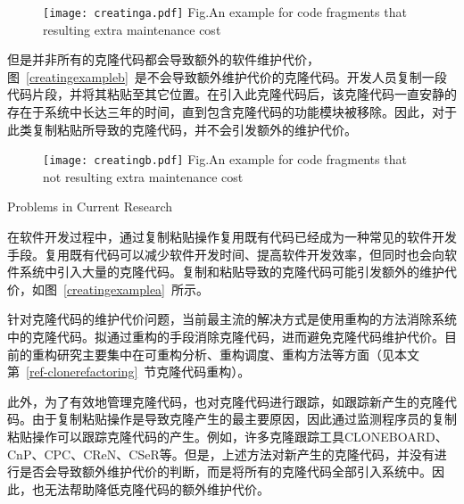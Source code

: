 \begin{figure}[htbp]
\centering
\texttt{[image: creatinga.pdf]}
{Fig.$\!$}{An example for code fragments that resulting extra maintenance cost}
\vspace{-1em}
\end{figure}


但是并非所有的克隆代码都会导致额外的软件维护代价，图~\ref{creatingexampleb}~是不会导致额外维护代价的克隆代码。开发人员复制一段代码片段，并将其粘贴至其它位置。在引入此克隆代码后，该克隆代码一直安静的存在于系统中长达三年的时间，直到包含克隆代码的功能模块被移除。因此，对于此类复制粘贴所导致的克隆代码，并不会引发额外的维护代价。

\begin{figure}[htbp]
\centering
\texttt{[image: creatingb.pdf]}
{Fig.$\!$}{An example for code fragments that not resulting extra maintenance cost}
\vspace{-1em}
\end{figure}

{Problems in Current Research}

在软件开发过程中，通过复制粘贴操作复用既有代码已经成为一种常见的软件开发手段\cite{koschke2007survey}。复用既有代码可以减少软件开发时间、提高软件开发效率，但同时也会向软件系统中引入大量的克隆代码。复制和粘贴导致的克隆代码可能引发额外的维护代价，如图~\ref{creatingexamplea}~所示。

针对克隆代码的维护代价问题，当前最主流的解决方式是使用重构的方法消除系统中的克隆代码。拟通过重构的手段消除克隆代码，进而避免克隆代码维护代价。目前的重构研究主要集中在可重构分析\cite{lin2014detecting,mende2009evaluation,schulze2008towards,choi2011extracting}、重构调度\cite{mandal2014automatic,lee2011automated,zibran2011constraint}、重构方法\cite{higo2008metric,krishnan2014unification,barbosa2013removing,ettinger2017efficient}等方面（见本文第~\ref{ref-clonerefactoring}~节克隆代码重构）。%

此外，为了有效地管理克隆代码，也对克隆代码进行跟踪，如跟踪新产生的克隆代码。由于复制粘贴操作是导致克隆产生的最主要原因，因此通过监测程序员的复制粘贴操作可以跟踪克隆代码的产生。例如，许多克隆跟踪工具CLONEBOARD\cite{de2009managing}、CnP\cite{hou2009cnp}、CPC\cite{weckerle2008cpc}、CReN\cite{jablonski2007cren}、CSeR\cite{jacob2010actively}等。但是，上述方法对新产生的克隆代码，并没有进行是否会导致额外维护代价的判断，而是将所有的克隆代码全部引入系统中。因此，也无法帮助降低克隆代码的额外维护代价。

